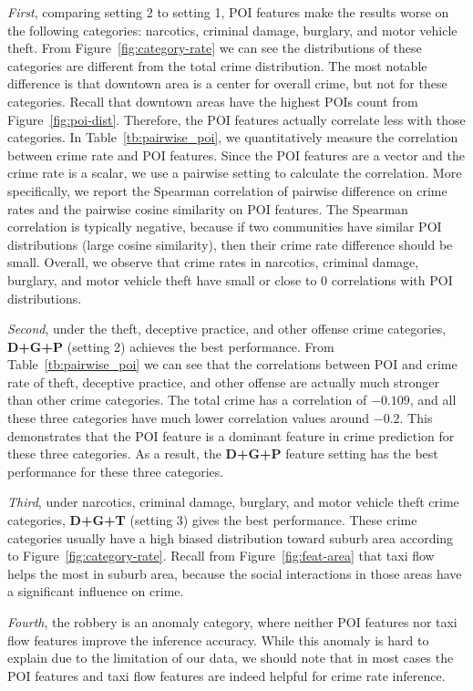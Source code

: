\emph{First}, comparing setting 2 to setting 1, POI features make the results worse on the following categories: narcotics, criminal damage, burglary, and motor vehicle theft. From Figure~\ref{fig:category-rate} we can see the distributions of these categories are different from the total crime distribution. The most notable difference is that downtown area is a center for overall crime, but not for these categories. Recall that downtown areas have the highest POIs count from Figure~\ref{fig:poi-dist}. Therefore, the POI features actually correlate less with those categories. In Table~\ref{tb:pairwise_poi}, we quantitatively measure the correlation between crime rate and POI features. Since the POI features are a vector and the crime rate is a scalar, we use a pairwise setting to calculate the correlation. More specifically, we report the Spearman correlation of pairwise difference on crime rates and the pairwise cosine similarity on POI features. The Spearman correlation is typically negative, because if two communities have similar POI distributions (large cosine similarity), then their crime rate difference should be small. Overall, we observe that crime rates in narcotics, criminal damage, burglary, and motor vehicle theft have small or close to 0 correlations with POI distributions.

\emph{Second}, under the theft, deceptive practice, and other offense crime categories, \textbf{D+G+P} (setting 2) achieves the best performance. From Table~\ref{tb:pairwise_poi} we can see that the correlations between POI and crime rate of theft, deceptive practice, and other offense are actually much stronger than other crime categories. The total crime has a correlation of $-0.109$, and all these three categories have much lower correlation values around $-0.2$. This demonstrates that the POI feature is a dominant feature in crime prediction for these three categories. As a result, the \textbf{D+G+P} feature setting has the best performance for these three categories. 

\emph{Third}, under narcotics, criminal damage, burglary, and motor vehicle theft crime categories, \textbf{D+G+T} (setting 3) gives the best performance. These crime categories usually have a high biased distribution toward suburb area according to Figure~\ref{fig:category-rate}. Recall from Figure~\ref{fig:feat-area} that taxi flow helps the most in suburb area, because the social interactions in those areas have a significant influence on crime.


\emph{Fourth}, the robbery is an anomaly category, where neither POI features nor taxi flow features improve the inference accuracy. While this anomaly is hard to explain due to the limitation of our data, we should note that in most cases the POI features and taxi flow features are indeed helpful for crime rate inference. 


